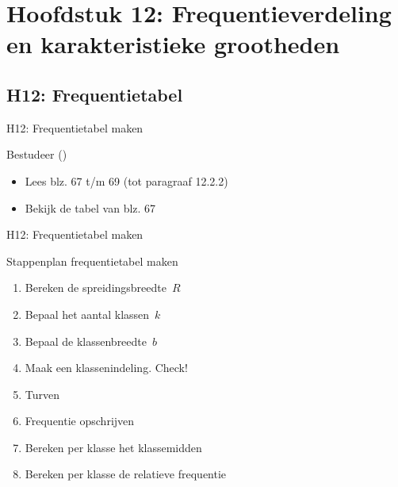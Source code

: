 \section{Hoofdstuk 12: Frequentieverdeling en karakteristieke grootheden}
\subsection{H12: Frequentietabel}
\begin{frame}{H12: Frequentietabel maken}
\begin{block}{Bestudeer (\ks)}
\begin{itemize}
 \item Lees blz. 67 t/m 69 (tot paragraaf 12.2.2)
 \item Bekijk de tabel van blz. 67
\end{itemize}
\end{block}
\end{frame}

\begin{frame}{H12: Frequentietabel maken}
\begin{alertblock}{Stappenplan frequentietabel maken}
\begin{enumerate}
 \item Bereken de spreidingsbreedte~$R$
 \item Bepaal het aantal klassen~$k$
 \item Bepaal de klassenbreedte~$b$
 \item Maak een klassenindeling. Check!
 \item Turven
 \item Frequentie opschrijven
 \item Bereken per klasse het klassemidden
 \item Bereken per klasse de relatieve frequentie
\end{enumerate}
\end{alertblock}
\end{frame}
